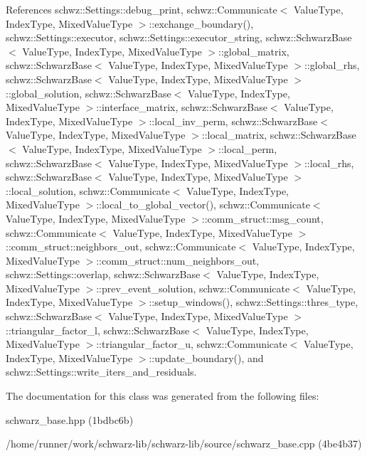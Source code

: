 References schwz\+::\+Settings\+::debug\+\_\+print, schwz\+::\+Communicate$<$ Value\+Type, Index\+Type, Mixed\+Value\+Type $>$\+::exchange\+\_\+boundary(), schwz\+::\+Settings\+::executor, schwz\+::\+Settings\+::executor\+\_\+string, schwz\+::\+Schwarz\+Base$<$ Value\+Type, Index\+Type, Mixed\+Value\+Type $>$\+::global\+\_\+matrix, schwz\+::\+Schwarz\+Base$<$ Value\+Type, Index\+Type, Mixed\+Value\+Type $>$\+::global\+\_\+rhs, schwz\+::\+Schwarz\+Base$<$ Value\+Type, Index\+Type, Mixed\+Value\+Type $>$\+::global\+\_\+solution, schwz\+::\+Schwarz\+Base$<$ Value\+Type, Index\+Type, Mixed\+Value\+Type $>$\+::interface\+\_\+matrix, schwz\+::\+Schwarz\+Base$<$ Value\+Type, Index\+Type, Mixed\+Value\+Type $>$\+::local\+\_\+inv\+\_\+perm, schwz\+::\+Schwarz\+Base$<$ Value\+Type, Index\+Type, Mixed\+Value\+Type $>$\+::local\+\_\+matrix, schwz\+::\+Schwarz\+Base$<$ Value\+Type, Index\+Type, Mixed\+Value\+Type $>$\+::local\+\_\+perm, schwz\+::\+Schwarz\+Base$<$ Value\+Type, Index\+Type, Mixed\+Value\+Type $>$\+::local\+\_\+rhs, schwz\+::\+Schwarz\+Base$<$ Value\+Type, Index\+Type, Mixed\+Value\+Type $>$\+::local\+\_\+solution, schwz\+::\+Communicate$<$ Value\+Type, Index\+Type, Mixed\+Value\+Type $>$\+::local\+\_\+to\+\_\+global\+\_\+vector(), schwz\+::\+Communicate$<$ Value\+Type, Index\+Type, Mixed\+Value\+Type $>$\+::comm\+\_\+struct\+::msg\+\_\+count, schwz\+::\+Communicate$<$ Value\+Type, Index\+Type, Mixed\+Value\+Type $>$\+::comm\+\_\+struct\+::neighbors\+\_\+out, schwz\+::\+Communicate$<$ Value\+Type, Index\+Type, Mixed\+Value\+Type $>$\+::comm\+\_\+struct\+::num\+\_\+neighbors\+\_\+out, schwz\+::\+Settings\+::overlap, schwz\+::\+Schwarz\+Base$<$ Value\+Type, Index\+Type, Mixed\+Value\+Type $>$\+::prev\+\_\+event\+\_\+solution, schwz\+::\+Communicate$<$ Value\+Type, Index\+Type, Mixed\+Value\+Type $>$\+::setup\+\_\+windows(), schwz\+::\+Settings\+::thres\+\_\+type, schwz\+::\+Schwarz\+Base$<$ Value\+Type, Index\+Type, Mixed\+Value\+Type $>$\+::triangular\+\_\+factor\+\_\+l, schwz\+::\+Schwarz\+Base$<$ Value\+Type, Index\+Type, Mixed\+Value\+Type $>$\+::triangular\+\_\+factor\+\_\+u, schwz\+::\+Communicate$<$ Value\+Type, Index\+Type, Mixed\+Value\+Type $>$\+::update\+\_\+boundary(), and schwz\+::\+Settings\+::write\+\_\+iters\+\_\+and\+\_\+residuals.



The documentation for this class was generated from the following files\+:\begin{DoxyCompactItemize}
\item 
schwarz\+\_\+base.\+hpp (1bdbc6b)\item 
/home/runner/work/schwarz-\/lib/schwarz-\/lib/source/schwarz\+\_\+base.\+cpp (4be4b37)\end{DoxyCompactItemize}

